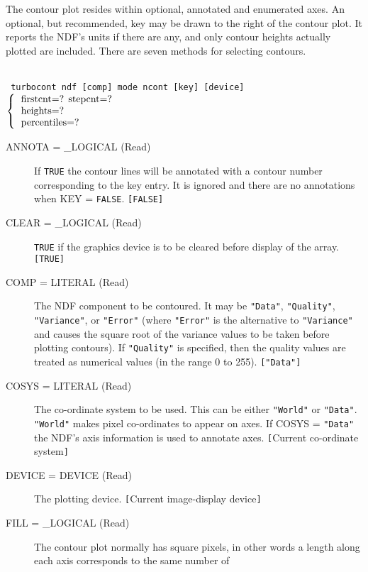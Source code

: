 \documentclass[twoside,11pt]{article}
\newcommand{\htmlref}[2]{#1}
\newcommand{\sstusage}[1]{\pagebreak[3] \item[Usage:] \mbox{} \\[1.3ex] {\ssttt #1}}
\newcommand{\sstparameters}[1]{
   \goodbreak 
   \item[Parameters:] \mbox{} \\
   \vspace{-3.5ex}
   \begin{description}
      #1
   \end{description}
}
\newcommand{\sstsubsection}[1]{ \item[{#1}] \mbox{} \\}
\newcommand{\ssttt}{\tt}
\renewcommand{\sstusage}[1]{\htmlref{\item[Usage:]}{ap:usage} \mbox{} \\ {\ssttt #1}}
\renewcommand{\sstparameters}[1]{
      \htmlref{\item[Parameters:]}{se:param}
      \begin{description}
         #1
      \end{description}
   }
\renewcommand{\sstsubsection}[1]{\item[{#1}]}
\begin{document}
{{      The contour plot resides within optional, annotated and enumerated
      axes.  An optional, but recommended, key may be drawn to the
      right of the contour plot.  It reports the NDF's units if there
      are any, and only contour heights actually plotted are included.
      There are seven methods for selecting contours.
   }
   \sstusage{
      turbocont ndf [comp] mode ncont [key] [device]
        $\left\{ {\begin{tabular}{l}
                    firstcnt=? stepcnt=? \\
                    heights=? \\
                    percentiles=?
                   \end{tabular} }
        \right.$
        \newline\hspace*{23.3em}
        \makebox[0mm][c]{\small mode}
   }
   \sstparameters{
      \sstsubsection{
         ANNOTA = \_LOGICAL (Read)
      }{
         If {\tt TRUE} the contour lines will be annotated with a contour
         number corresponding to the key entry.  It is ignored and there
         are no annotations when KEY = {\tt FALSE}.  {\tt [FALSE]}
      }
      \sstsubsection{
         CLEAR = \_LOGICAL (Read)
      }{
         {\tt TRUE} if the graphics device is to be cleared before display
         of the array. {\tt [TRUE]}
      }
      \sstsubsection{
         COMP = LITERAL (Read)
      }{
         The NDF component to be contoured.  It may be {\tt "Data"},
         {\tt "Quality"}, {\tt "Variance"}, or {\tt "Error"} (where
         {\tt "Error"} is the alternative to {\tt "Variance"} and causes
         the square root of the variance values to be taken before
         plotting contours).  If {\tt "Quality"} is specified, then
         the quality values are treated as numerical values (in the
         range 0 to 255).  {\tt ["Data"]}
      }
      \sstsubsection{
         COSYS = LITERAL (Read)
      }{
         The co-ordinate system to be used.  This can be either {\tt "World"}
         or {\tt "Data"}.  {\tt "World"} makes pixel co-ordinates to appear on axes.
         If COSYS = {\tt "Data"} the NDF's axis information is used to
         annotate axes.  {\tt [}Current co-ordinate system{\tt ]}
      }
      \sstsubsection{
         DEVICE = DEVICE (Read)
      }{
         The plotting device. {\tt [}Current image-display device{\tt ]}
      }
      \sstsubsection{
         FILL = \_LOGICAL (Read)
      }{
         The contour plot normally has square pixels, in other words
         a length along each axis corresponds to the same number of
}}}
\end{document}

